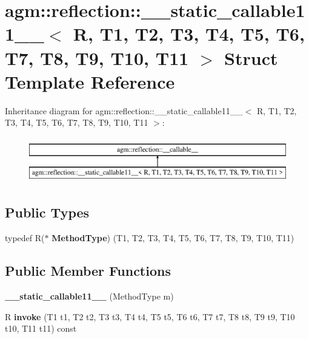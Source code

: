 \hypertarget{structagm_1_1reflection_1_1____static__callable11____}{}\section{agm\+:\+:reflection\+:\+:\+\_\+\+\_\+static\+\_\+callable11\+\_\+\+\_\+$<$ R, T1, T2, T3, T4, T5, T6, T7, T8, T9, T10, T11 $>$ Struct Template Reference}
\label{structagm_1_1reflection_1_1____static__callable11____}
Inheritance diagram for agm\+:\+:reflection\+:\+:\+\_\+\+\_\+static\+\_\+callable11\+\_\+\+\_\+$<$ R, T1, T2, T3, T4, T5, T6, T7, T8, T9, T10, T11 $>$\+:\begin{figure}[H]
\begin{center}
\leavevmode
\includegraphics[height=2.000000cm]{structagm_1_1reflection_1_1____static__callable11____}
\end{center}
\end{figure}
\subsection*{Public Types}
\begin{DoxyCompactItemize}
\item 
typedef R($\ast$ {\bfseries Method\+Type}) (T1, T2, T3, T4, T5, T6, T7, T8, T9, T10, T11)\hypertarget{structagm_1_1reflection_1_1____static__callable11_____ab01fdd0820b93dd090f113b960ddeb7f}{}\label{structagm_1_1reflection_1_1____static__callable11_____ab01fdd0820b93dd090f113b960ddeb7f}

\end{DoxyCompactItemize}
\subsection*{Public Member Functions}
\begin{DoxyCompactItemize}
\item 
{\bfseries \+\_\+\+\_\+static\+\_\+callable11\+\_\+\+\_\+} (Method\+Type m)\hypertarget{structagm_1_1reflection_1_1____static__callable11_____a23e5562cf7bc6832a9b8a6aac22e156a}{}\label{structagm_1_1reflection_1_1____static__callable11_____a23e5562cf7bc6832a9b8a6aac22e156a}

\item 
R {\bfseries invoke} (T1 t1, T2 t2, T3 t3, T4 t4, T5 t5, T6 t6, T7 t7, T8 t8, T9 t9, T10 t10, T11 t11) const \hypertarget{structagm_1_1reflection_1_1____static__callable11_____afec8fd5d1d11d5c44a54999e7dafb498}{}\label{structagm_1_1reflection_1_1____static__callable11_____afec8fd5d1d11d5c44a54999e7dafb498}

\end{DoxyCompactItemize}
